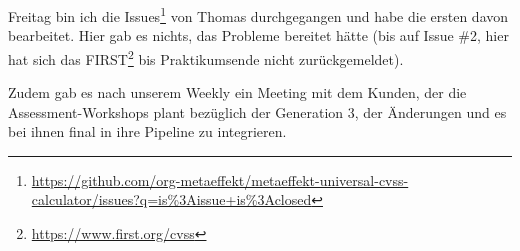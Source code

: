 \sweekdaymarginpar{\weekdayFridayLong}

Freitag bin ich die Issues\footnote{\url{https://github.com/org-metaeffekt/metaeffekt-universal-cvss-calculator/issues?q=is\%3Aissue+is\%3Aclosed}} von Thomas durchgegangen und habe die ersten davon bearbeitet.
Hier gab es nichts, das Probleme bereitet hätte (bis auf Issue \#2, hier hat sich das FIRST\footnote{\url{https://www.first.org/cvss}} bis Praktikumsende nicht zurückgemeldet).

Zudem gab es nach unserem Weekly ein Meeting mit dem Kunden, der die Assessment-Workshops plant bezüglich der Generation 3, der Änderungen und es bei ihnen final in ihre Pipeline zu integrieren.

